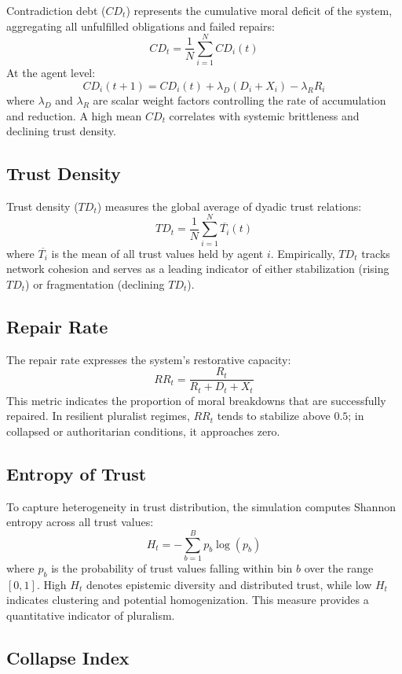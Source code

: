\documentclass[11pt]{article}
\begin{document}
Contradiction debt ($CD_t$) represents the cumulative moral deficit of the system, aggregating all unfulfilled obligations and failed repairs:
\[
CD_t = \frac{1}{N}\sum_{i=1}^{N} CD_i(t)
\]
At the agent level:
\[
CD_i(t+1) = CD_i(t) + \lambda_D (D_i + X_i) - \lambda_R R_i
\]
where $\lambda_D$ and $\lambda_R$ are scalar weight factors controlling the rate of accumulation and reduction.  
A high mean $CD_t$ correlates with systemic brittleness and declining trust density.

\subsection{Trust Density}

Trust density ($TD_t$) measures the global average of dyadic trust relations:
\[
TD_t = \frac{1}{N}\sum_{i=1}^{N} \overline{T_i}(t)
\]
where $\overline{T_i}$ is the mean of all trust values held by agent $i$.  
Empirically, $TD_t$ tracks network cohesion and serves as a leading indicator of either stabilization (rising $TD_t$) or fragmentation (declining $TD_t$).

\subsection{Repair Rate}

The repair rate expresses the system’s restorative capacity:
\[
RR_t = \frac{R_t}{R_t + D_t + X_t}
\]
This metric indicates the proportion of moral breakdowns that are successfully repaired.  
In resilient pluralist regimes, $RR_t$ tends to stabilize above $0.5$; in collapsed or authoritarian conditions, it approaches zero.

\subsection{Entropy of Trust}

To capture heterogeneity in trust distribution, the simulation computes Shannon entropy across all trust values:
\[
H_t = -\sum_{b=1}^{B} p_b \log(p_b)
\]
where $p_b$ is the probability of trust values falling within bin $b$ over the range $[0,1]$.  
High $H_t$ denotes epistemic diversity and distributed trust, while low $H_t$ indicates clustering and potential homogenization.  
This measure provides a quantitative indicator of pluralism.

\subsection{Collapse Index}
\end{document}

